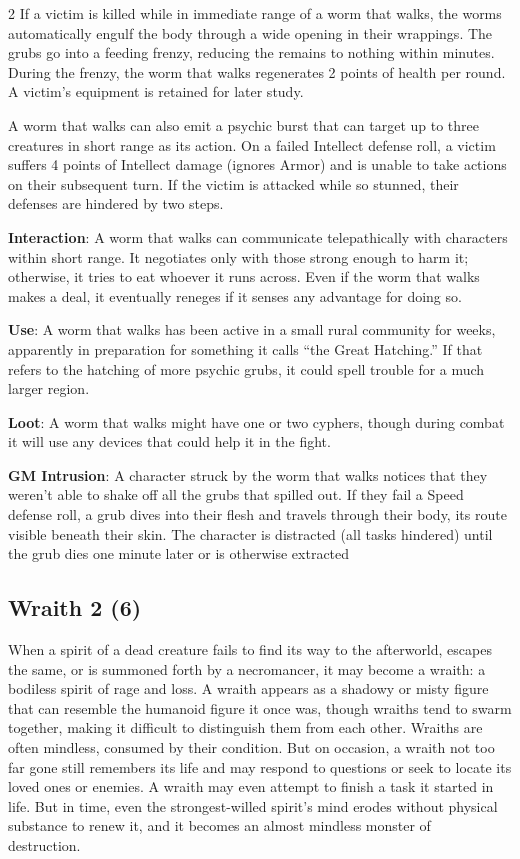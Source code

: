 \begin{multicols}{2}
If a victim is killed while in immediate range of a worm that walks, the worms automatically engulf the body through a wide opening in their wrappings. The grubs go into a feeding frenzy, reducing the remains to nothing within minutes. During the frenzy, the worm that walks regenerates 2 points of health per round. A victim’s equipment is retained for later study. 

A worm that walks can also emit a psychic burst that can target up to three creatures in short range as its action. On a failed Intellect defense roll, a victim suffers 4 points of Intellect damage (ignores Armor) and is unable to take actions on their subsequent turn. If the victim is attacked while so stunned, their defenses are hindered by two steps. 

\textbf{Interaction}: A worm that walks can communicate telepathically with characters within short range. It negotiates only with those strong enough to harm it; otherwise, it tries to eat whoever it runs across. Even if the worm that walks makes a deal, it eventually reneges if it senses any advantage for doing so. 

\textbf{Use}: A worm that walks has been active in a small rural community for weeks, apparently in preparation for something it calls “the Great Hatching.” If that refers to the hatching of more psychic grubs, it could spell trouble for a much larger region. 

\textbf{Loot}: A worm that walks might have one or two cyphers, though during combat it will use any devices that could help it in the fight.

\textbf{GM Intrusion}: A character struck by the worm that walks notices that they weren’t able to shake off all the grubs that spilled out. If they fail a Speed defense roll, a grub dives into their flesh and travels through their body, its route visible beneath their skin. The character is distracted (all tasks hindered) until the grub dies one minute later or is otherwise extracted

\subsection{Wraith 2 (6)}

When a spirit of a dead creature fails to find its way to the afterworld, escapes the same, or is summoned forth by a necromancer, it may become a wraith: a bodiless spirit of rage and loss. A wraith appears as a shadowy or misty figure that can resemble the humanoid figure it once was, though wraiths tend to swarm together, making it difficult to distinguish them from each other. Wraiths are often mindless, consumed by their condition. But on occasion, a wraith not too far gone still remembers its life and may respond to questions or seek to locate its loved ones or enemies. A wraith may even attempt to finish a task it started in life. But in time, even the strongest-willed spirit’s mind erodes without physical substance to renew it, and it becomes an almost mindless monster of destruction. 


\end{multicols}
